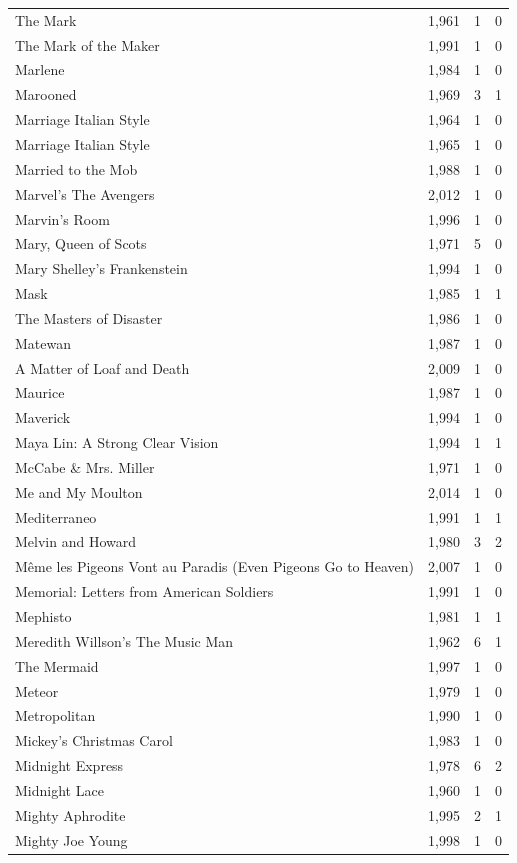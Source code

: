 \begin{tabular}{lrrr}
The Mark & 1,961 & 1 & 0 \\
The Mark of the Maker & 1,991 & 1 & 0 \\
Marlene & 1,984 & 1 & 0 \\
Marooned & 1,969 & 3 & 1 \\
Marriage Italian Style & 1,964 & 1 & 0 \\
Marriage Italian Style & 1,965 & 1 & 0 \\
Married to the Mob & 1,988 & 1 & 0 \\
Marvel's The Avengers & 2,012 & 1 & 0 \\
Marvin's Room & 1,996 & 1 & 0 \\
Mary, Queen of Scots & 1,971 & 5 & 0 \\
Mary Shelley's Frankenstein & 1,994 & 1 & 0 \\
Mask & 1,985 & 1 & 1 \\
The Masters of Disaster & 1,986 & 1 & 0 \\
Matewan & 1,987 & 1 & 0 \\
A Matter of Loaf and Death & 2,009 & 1 & 0 \\
Maurice & 1,987 & 1 & 0 \\
Maverick & 1,994 & 1 & 0 \\
Maya Lin: A Strong Clear Vision & 1,994 & 1 & 1 \\
McCabe \& Mrs. Miller & 1,971 & 1 & 0 \\
Me and My Moulton & 2,014 & 1 & 0 \\
Mediterraneo & 1,991 & 1 & 1 \\
Melvin and Howard & 1,980 & 3 & 2 \\
Même les Pigeons Vont au Paradis (Even Pigeons Go to Heaven) & 2,007 & 1 & 0 \\
Memorial: Letters from American Soldiers & 1,991 & 1 & 0 \\
Mephisto & 1,981 & 1 & 1 \\
Meredith Willson's The Music Man & 1,962 & 6 & 1 \\
The Mermaid & 1,997 & 1 & 0 \\
Meteor & 1,979 & 1 & 0 \\
Metropolitan & 1,990 & 1 & 0 \\
Mickey's Christmas Carol & 1,983 & 1 & 0 \\
Midnight Express & 1,978 & 6 & 2 \\
Midnight Lace & 1,960 & 1 & 0 \\
Mighty Aphrodite & 1,995 & 2 & 1 \\
Mighty Joe Young & 1,998 & 1 & 0 \\

\end{tabular}
